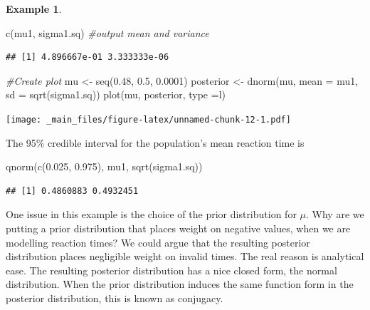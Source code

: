 \documentclass[
]{book}
\newenvironment{Shaded}{\begin{snugshade}}{\end{snugshade}}
\newcommand{\AttributeTok}[1]{\textcolor[rgb]{0.77,0.63,0.00}{#1}}
\newcommand{\CommentTok}[1]{\textcolor[rgb]{0.56,0.35,0.01}{\textit{#1}}}
\newcommand{\FloatTok}[1]{\textcolor[rgb]{0.00,0.00,0.81}{#1}}
\newcommand{\FunctionTok}[1]{\textcolor[rgb]{0.00,0.00,0.00}{#1}}
\newcommand{\NormalTok}[1]{#1}
\newcommand{\OtherTok}[1]{\textcolor[rgb]{0.56,0.35,0.01}{#1}}
\newcommand{\StringTok}[1]{\textcolor[rgb]{0.31,0.60,0.02}{#1}}
\theoremstyle{definition}
\theoremstyle{definition}
\newtheorem{example}{Example}[chapter]
\theoremstyle{definition}
\theoremstyle{definition}
\theoremstyle{remark}
\begin{document}
\begin{example}
\begin{Shaded}
\begin{Highlighting}[]
\FunctionTok{c}\NormalTok{(mu1, sigma1.sq) }\CommentTok{\#output mean and variance}
\end{Highlighting}
\end{Shaded}

\begin{verbatim}
## [1] 4.896667e-01 3.333333e-06
\end{verbatim}

\begin{Shaded}
\begin{Highlighting}[]
\CommentTok{\#Create plot}
\NormalTok{mu }\OtherTok{\textless{}{-}} \FunctionTok{seq}\NormalTok{(}\FloatTok{0.48}\NormalTok{, }\FloatTok{0.5}\NormalTok{, }\FloatTok{0.0001}\NormalTok{) }
\NormalTok{posterior }\OtherTok{\textless{}{-}} \FunctionTok{dnorm}\NormalTok{(mu, }\AttributeTok{mean =}\NormalTok{ mu1, }\AttributeTok{sd =} \FunctionTok{sqrt}\NormalTok{(sigma1.sq))}
\FunctionTok{plot}\NormalTok{(mu, posterior, }\AttributeTok{type =}\StringTok{\textquotesingle{}l\textquotesingle{}}\NormalTok{)}
\end{Highlighting}
\end{Shaded}

\texttt{[image: \_main\_files/figure-latex/unnamed-chunk-12-1.pdf]}

The 95\% credible interval for the population's mean reaction time is

\begin{Shaded}
\begin{Highlighting}[]
\FunctionTok{qnorm}\NormalTok{(}\FunctionTok{c}\NormalTok{(}\FloatTok{0.025}\NormalTok{, }\FloatTok{0.975}\NormalTok{), mu1, }\FunctionTok{sqrt}\NormalTok{(sigma1.sq))}
\end{Highlighting}
\end{Shaded}

\begin{verbatim}
## [1] 0.4860883 0.4932451
\end{verbatim}

\end{example}

One issue in this example is the choice of the prior distribution for \(\mu\). Why are we putting a prior distribution that places weight on negative values, when we are modelling reaction times? We could argue that the resulting posterior distribution places negligible weight on invalid times. The real reason is analytical ease. The resulting posterior distribution has a nice closed form, the normal distribution. When the prior distribution induces the same function form in the posterior distribution, this is known as conjugacy.
\end{document}
